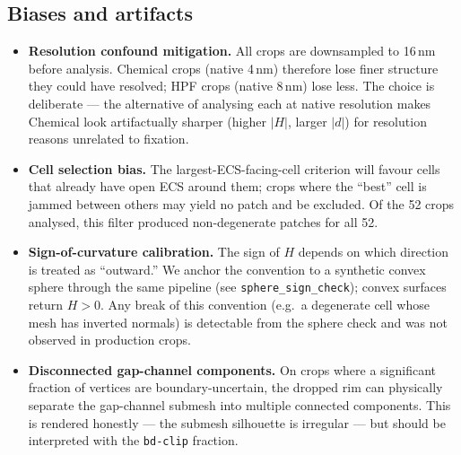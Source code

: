 \subsection*{Biases and artifacts}
\begin{itemize}[nosep]
\item \textbf{Resolution confound mitigation.} All crops are
downsampled to 16\,nm before analysis. Chemical crops (native 4\,nm)
therefore lose finer structure they could have resolved; HPF crops
(native 8\,nm) lose less. The choice is deliberate --- the alternative
of analysing each at native resolution makes Chemical look
artifactually sharper (higher $|H|$, larger $|d|$) for resolution
reasons unrelated to fixation.
\item \textbf{Cell selection bias.} The largest-ECS-facing-cell
criterion will favour cells that already have open ECS around them;
crops where the ``best'' cell is jammed between others may yield no
patch and be excluded. Of the 52 crops analysed, this filter produced
non-degenerate patches for all 52.
\item \textbf{Sign-of-curvature calibration.} The sign of $H$ depends
on which direction is treated as ``outward.'' We anchor the convention
to a synthetic convex sphere through the same pipeline (see
\texttt{sphere\_sign\_check}); convex surfaces return $H > 0$. Any
break of this convention (e.g.~a degenerate cell whose mesh has
inverted normals) is detectable from the sphere check and was not
observed in production crops.
\item \textbf{Disconnected gap-channel components.} On crops where a
significant fraction of vertices are boundary-uncertain, the dropped
rim can physically separate the gap-channel submesh into multiple
connected components. This is rendered honestly --- the submesh
silhouette is irregular --- but should be interpreted with the
\texttt{bd-clip} fraction.
\end{itemize}

